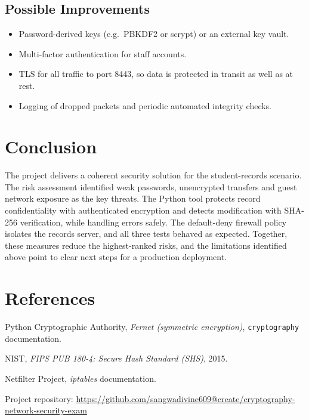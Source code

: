 \documentclass[11pt,a4paper]{article}
\begin{document}
\subsection{Possible Improvements}
\begin{itemize}[leftmargin=*]
  \item Password-derived keys (e.g.\ PBKDF2 or scrypt) or an external key vault.
  \item Multi-factor authentication for staff accounts.
  \item TLS for all traffic to port 8443, so data is protected in transit as well as at rest.
  \item Logging of dropped packets and periodic automated integrity checks.
\end{itemize}

\section{Conclusion}
The project delivers a coherent security solution for the student-records scenario.
The risk assessment identified weak passwords, unencrypted transfers and guest
network exposure as the key threats. The Python tool protects record
confidentiality with authenticated encryption and detects modification with SHA-256
verification, while handling errors safely. The default-deny firewall policy
isolates the records server, and all three tests behaved as expected. Together,
these measures reduce the highest-ranked risks, and the limitations identified above
point to clear next steps for a production deployment.

\section*{References}
\begin{enumerate}[label={[\arabic*]},leftmargin=*]
  \item Python Cryptographic Authority, \textit{Fernet (symmetric encryption)},
        \texttt{cryptography} documentation.
  \item NIST, \textit{FIPS PUB 180-4: Secure Hash Standard (SHS)}, 2015.
  \item Netfilter Project, \textit{iptables} documentation.
  \item Project repository:
        \url{https://github.com/sangwadivine609@create/cryptography-network-security-exam}
\end{enumerate}
\end{document}
